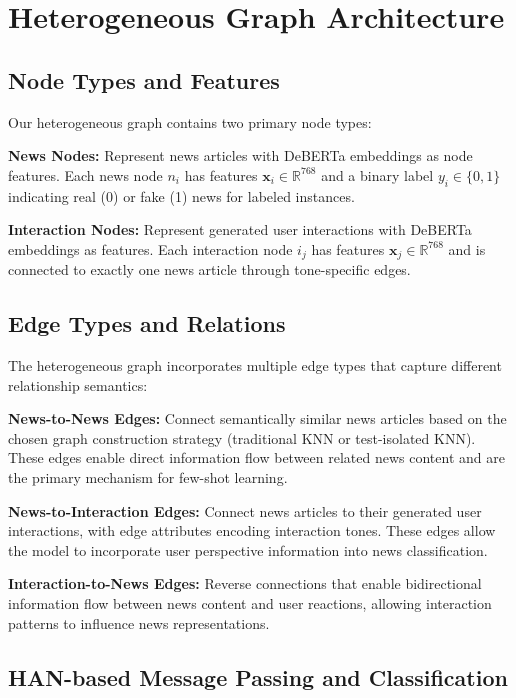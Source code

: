 \section{Heterogeneous Graph Architecture}

\subsection{Node Types and Features}

Our heterogeneous graph contains two primary node types:

\textbf{News Nodes:} Represent news articles with DeBERTa embeddings as node features. Each news node $n_i$ has features $\mathbf{x}_i \in \mathbb{R}^{768}$ and a binary label $y_i \in \{0, 1\}$ indicating real (0) or fake (1) news for labeled instances.

\textbf{Interaction Nodes:} Represent generated user interactions with DeBERTa embeddings as features. Each interaction node $i_j$ has features $\mathbf{x}_j \in \mathbb{R}^{768}$ and is connected to exactly one news article through tone-specific edges.

\subsection{Edge Types and Relations}

The heterogeneous graph incorporates multiple edge types that capture different relationship semantics:

\textbf{News-to-News Edges:} Connect semantically similar news articles based on the chosen graph construction strategy (traditional KNN or test-isolated KNN). These edges enable direct information flow between related news content and are the primary mechanism for few-shot learning.

\textbf{News-to-Interaction Edges:} Connect news articles to their generated user interactions, with edge attributes encoding interaction tones. These edges allow the model to incorporate user perspective information into news classification.

\textbf{Interaction-to-News Edges:} Reverse connections that enable bidirectional information flow between news content and user reactions, allowing interaction patterns to influence news representations.

\subsection{HAN-based Message Passing and Classification}

